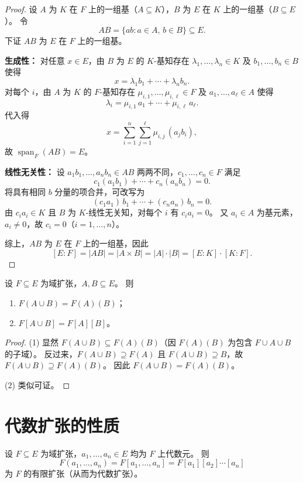 \documentclass[lang=cn,a4paper,newtx]{elegantbook}
\begin{document}
\begin{proof}
  设 $A$ 为 $K$ 在 $F$ 上的一组基（$A\subseteq K$），$B$ 为 $E$ 在 $K$ 上的一组基（$B\subseteq E$）。
  令
  \[
    AB=\{ab: a\in A,\, b\in B\}\subseteq E.
  \]
  下证 $AB$ 为 $E$ 在 $F$ 上的一组基。

  \textbf{生成性：}
  对任意 $x\in E$，由 $B$ 为 $E$ 的 $K$-基知存在 $\lambda_1,\dots,\lambda_n\in K$ 及 $b_1,\dots,b_n\in B$ 使得
  \[
    x=\lambda_1 b_1+\cdots+\lambda_n b_n.
  \]
  对每个 $i$，由 $A$ 为 $K$ 的 $F$-基知存在 $\mu_{i,1},\dots,\mu_{i,\ell}\in F$ 及 $a_1,\dots,a_{\ell}\in A$ 使得
  \[
    \lambda_i=\mu_{i,1}\,a_1+\cdots+\mu_{i,\ell}\,a_{\ell}.
  \]
  代入得
  \[
    x=\sum_{i=1}^{n}\sum_{j=1}^{\ell}\mu_{i,j}\,(a_j b_i),
  \]
  故 $\operatorname{span}_F(AB)=E$。

  \textbf{线性无关性：}
  设 $a_1 b_1,\dots,a_n b_n\in AB$ 两两不同，$c_1,\dots,c_n\in F$ 满足
  \[
    c_1(a_1 b_1)+\cdots+c_n(a_n b_n)=0.
  \]
  将具有相同 $b$ 分量的项合并，可改写为
  \[
    (c_1 a_1)\,b_1+\cdots+(c_n a_n)\,b_n=0.
  \]
  由 $c_i a_i\in K$ 且 $B$ 为 $K$-线性无关知，对每个 $i$ 有 $c_i a_i=0$。
  又 $a_i\in A$ 为基元素，$a_i\ne 0$，故 $c_i=0$（$i=1,\dots,n$）。

  综上，$AB$ 为 $E$ 在 $F$ 上的一组基，因此
  \[
    [E:F]=|AB|=|A\times B|=|A|\cdot|B|=[E:K]\cdot[K:F].
  \]
\end{proof}

\begin{proposition}\label{composite-field}
  设 $F\subseteq E$ 为域扩张，$A,B\subseteq E$。
  则
  \begin{enumerate}
    \item $F(A\cup B)=F(A)(B)$；
    \item $F[A\cup B]=F[A][B]$。
  \end{enumerate}
\end{proposition}

\begin{proof}
  (1) 显然 $F(A\cup B)\subseteq F(A)(B)$（因 $F(A)(B)$ 为包含 $F\cup A\cup B$ 的子域）。
  反过来，$F(A\cup B)\supseteq F(A)$ 且 $F(A\cup B)\supseteq B$，故 $F(A\cup B)\supseteq F(A)(B)$。
  因此 $F(A\cup B)=F(A)(B)$。

  (2) 类似可证。
\end{proof}

\section{代数扩张的性质}

\begin{proposition}\label{finite-algebraic-extension}
  设 $F\subseteq E$ 为域扩张，$a_1,\dots,a_n\in E$ 均为 $F$ 上代数元。
  则
  \[
    F(a_1,\dots,a_n)=F[a_1,\dots,a_n]=F[a_1][a_2]\cdots[a_n]
  \]
  为 $F$ 的有限扩张（从而为代数扩张）。
\end{proposition}
\end{document}
